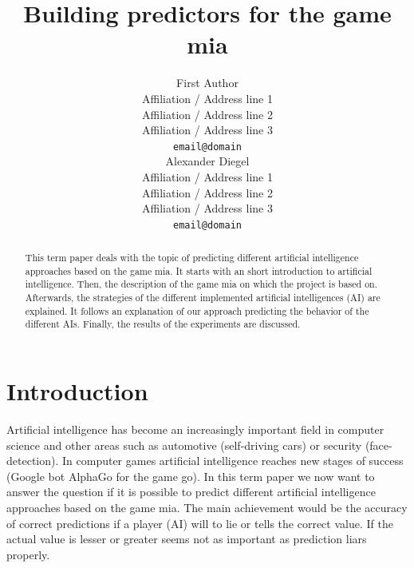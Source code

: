 \documentclass[11pt]{article}
\title{Building predictors for the game mia}
\author{First Author \\
  Affiliation / Address line 1 \\
  Affiliation / Address line 2 \\
  Affiliation / Address line 3 \\
  {\tt email@domain} \\\And
  Alexander Diegel \\
  Affiliation / Address line 1 \\
  Affiliation / Address line 2 \\
  Affiliation / Address line 3 \\
  {\tt email@domain} \\}
\date{}
\begin{document}
\maketitle
\begin{abstract}
  This term paper deals with the topic of predicting different artificial intelligence approaches based on the game mia. It starts with an short introduction to artificial intelligence. Then, the description of the game mia on which the project is based on. Afterwards, the strategies of the different implemented artificial intelligences (AI) are explained. It follows an explanation of our approach predicting the behavior of the different AIs. Finally, the results of the experiments are discussed.
\end{abstract}


\section{Introduction}
Artificial intelligence has become an increasingly important field in computer science and other areas such as automotive (self-driving cars) or security (face-detection).
In computer games artificial intelligence reaches new stages of success (Google bot AlphaGo for the game go). In this term paper we now want to answer the question if it is possible to predict different artificial intelligence approaches based on the game mia. The main achievement would be the accuracy of correct predictions if a player (AI) will to lie or tells the correct value. If the actual value is lesser or greater seems not as important as prediction liars properly. 
\end{document}
